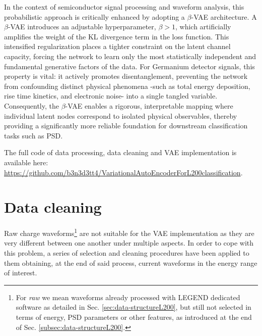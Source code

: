 In the context of semiconductor signal processing and waveform analysis, this probabilistic approach is critically enhanced by adopting a $\beta$-VAE architecture. A $\beta$-VAE introduces an adjustable hyperparameter, $\beta > 1$, which artificially amplifies the weight of the KL divergence term in the loss function. This intensified regularization places a tighter constraint on the latent channel capacity, forcing the network to learn only the most statistically independent and fundamental generative factors of the data. For Germanium detector signals, this property is vital: it actively promotes disentanglement, preventing the network from confounding distinct physical phenomena -such as total energy deposition, rise time kinetics, and electronic noise- into a single tangled variable. Consequently, the $\beta$-VAE enables a rigorous, interpretable mapping where individual latent nodes correspond to isolated physical observables, thereby providing a significantly more reliable foundation for downstream classification tasks such as \ac{PSD}.

The full code of data processing, data cleaning and \ac{VAE} implementation is available here: \url{https://github.com/b3n3d3tt4/VariationalAutoEncoderForL200classification}. 

\section{Data cleaning}
\label{sec:data-cleaning}
Raw charge waveforms\footnote{For \textit{raw} we mean waveforms already processed with LEGEND dedicated software as detailed in Sec. \ref{sec:data-structureL200}, but still not selected in terms of energy, \ac{PSD} parameters or other features, as introduced at the end of Sec. \ref{subsec:data-structureL200}.} are not suitable for the \ac{VAE} implementation as they are very different between one another under multiple aspects. In order to cope with this problem, a series of selection and cleaning procedures have been applied to them obtaining, at the end of said process, current waveforms in the energy range of interest.

